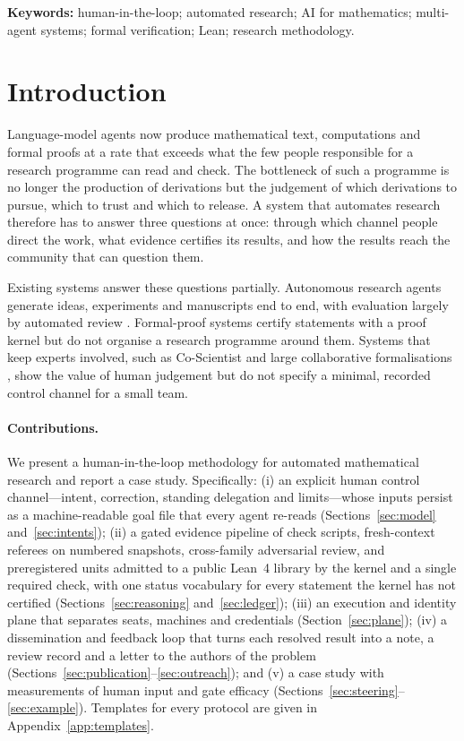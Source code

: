 \documentclass[11pt]{article}
\begin{document}
\noindent\textbf{Keywords:} human-in-the-loop; automated research; AI for
mathematics; multi-agent systems; formal verification; Lean; research
methodology.

\section{Introduction}
\label{sec:idea}
Language-model agents now produce mathematical text, computations and formal
proofs at a rate that exceeds what the few people responsible for a research
programme can read and check. The bottleneck of such a programme is no longer
the production of derivations but the judgement of which derivations to
pursue, which to trust and which to release. A system that automates research
therefore has to answer three questions at once: through which channel people
direct the work, what evidence certifies its results, and how the results
reach the community that can question them.

Existing systems answer these questions partially. Autonomous research agents
generate ideas, experiments and manuscripts end to end, with evaluation
largely by automated review \citep{aiscientist,scientistv2,scientisttwo,kosmos}.
Formal-proof systems certify statements with a proof kernel
\citep{alphaproof,leandojo,deepseekprover2} but do not organise a research
programme around them. Systems that keep experts involved, such as
Co-Scientist \citep{coscientist} and large collaborative formalisations
\citep{etp}, show the value of human judgement but do not specify a minimal,
recorded control channel for a small team.

\paragraph{Contributions.} We present a human-in-the-loop methodology for
automated mathematical research and report a case study. Specifically:
(i) an explicit human control channel---intent, correction, standing
delegation and limits---whose inputs persist as a machine-readable goal file
that every agent re-reads (Sections~\ref{sec:model} and~\ref{sec:intents});
(ii) a gated evidence pipeline of check scripts, fresh-context referees on
numbered snapshots, cross-family adversarial review, and preregistered units
admitted to a public Lean~4 library by the kernel and a single required
check, with one status vocabulary for every statement the kernel has not
certified (Sections~\ref{sec:reasoning} and~\ref{sec:ledger});
(iii) an execution and identity plane that separates seats, machines and
credentials (Section~\ref{sec:plane}); (iv) a dissemination and feedback loop
that turns each resolved result into a note, a review record and a letter to
the authors of the problem (Sections~\ref{sec:publication}--\ref{sec:outreach});
and (v) a case study with measurements of human input and gate efficacy
(Sections~\ref{sec:steering}--\ref{sec:example}). Templates for every protocol
are given in Appendix~\ref{app:templates}.
\end{document}
